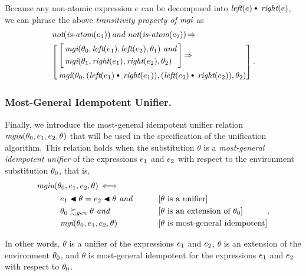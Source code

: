 \documentclass[runningheads]{llncs}
\DeclareMathOperator{\uand}{\emph{and}\,}
\DeclareMathOperator{\unot}{\emph{not}\kern-.0pt}
\DeclareMathOperator{\uimplies}{\Rightarrow}
\DeclareMathOperator{\uiff}{\iff}
\DeclareMathOperator{\isatm}{\emph{is-atom}}
\DeclareMathOperator{\lef}{\emph{left}}
\DeclareMathOperator{\rig}{\emph{right}}
\DeclareMathOperator{\mgi}{\emph{mgi}}
\DeclareMathOperator{\mgiu}{\emph{mgiu}}
\begin{document}
  Because any non-atomic expression $e$ can be decomposed into  $\lef(e)\cons \rig(e)$, we can phrase the above \emph{transitivity property of $\mgi$} as
    \[
    \begin{aligned}
    &\unot(\isatm(\e{1})) \uand \unot(\isatm(\e{2})) \uimplies\\
&\left[    \begin{aligned}
   &\left[\begin{aligned}
  &\mgi (\thet{0}, \lef(\e{1}), \lef(\e{2}), \thet{1})
  \, \uand \\
   &\mgi (\thet{1}, \rig(\e{1}), \rig(\e{2}), \thet{2}) 
   \end{aligned}\right] \uimplies \\
  &\mgi(\thet{0}, (\lef(\e{1}) {\cons} \rig(\e{1})), (\lef(\e{2}) {\cons} \rig(\e{2})), \thet{2})
   \end{aligned} \right].
   \end{aligned}
    \]

      \subsubsection{Most-General Idempotent Unifier.} 
Finally, we introduce the most-general idempotent unifier relation ${\mgiu} (\thet{0}, \e{1}, \e{2}, \theta)$ that will be used in the specification of the unification algorithm.  This relation holds when the substitution $\theta$ is a \emph{most-general idempotent unifier} of the expressions $e_{1}$ and $e_{2}$ with respect to the environment substitution $\theta_{0}$, that is, 
\begin{align*} 
 {\mgiu}(&\thet{0}, \e{1}, \e{2}, \theta) \uiff \\
&\begin{aligned}
&\e{1} \apply \theta = \e{2} \apply \theta \, \uand 
&&\text{\qquad [$\theta$ is a unifier]} \\
 \,\, & \thet{0} \moregen \theta \, \uand
&&\text{\qquad [$\theta$ is an extension of $\thet{0}]$}\\
  \,\, & {\mgi}(\thet{0}, \e{1}, \e{2}, \theta)
 &&\text{\qquad [$\theta$ is most-general idempotent]}
 \end{aligned}.\end{align*}
   
   
   \noindent In other words, $\theta$ is a unifier of the expressions $e_{1}$ and $e_{2}$, $\theta$ is an extension of the environment $\theta_{0}$, and $\theta$ is most-general idempotent for the expressions $e_{1}$ and $e_{2}$ with respect to $\theta_{0}$.
\end{document}
